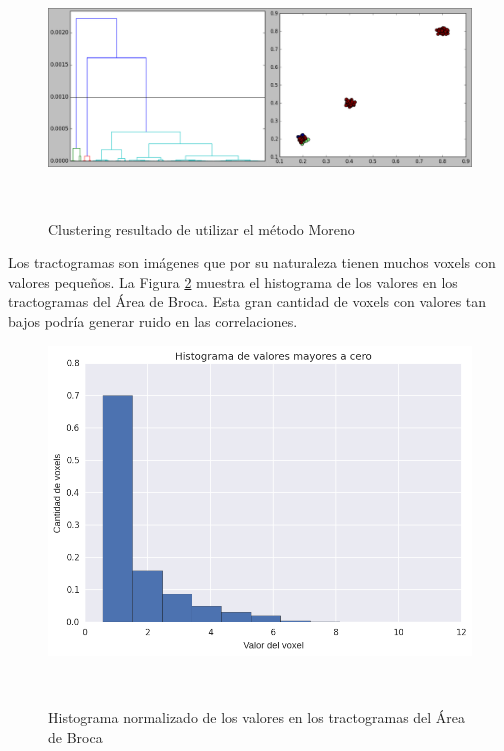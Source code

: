 \begin{figure}[h!]

\centering                                                                                                          
\begin{minipage}[b]{0.85\textwidth}
    \includegraphics[width=\textwidth]{img/3pop_moreno.png}
    \caption{Clustering resultado de utilizar el m\'etodo Moreno}
    \label{fig:3moreno}
\end{minipage} ~

\end{figure}  

Los tractogramas son im\'agenes que por su naturaleza tienen muchos voxels con 
valores peque\~nos. La Figura \ref{fig:hist_tract} muestra el histograma de los
valores en los tractogramas del \'Area de Broca. Esta gran cantidad
de voxels con valores tan bajos podr\'ia generar ruido en las correlaciones.  

\begin{figure}[h!]
              \centering                                                                                                          
\begin{minipage}[b]{0.8\textwidth}
    \includegraphics[width=\textwidth]{img/hist_tract.png}
    \caption{Histograma normalizado de los valores en los tractogramas del \'Area de Broca}
    \label{fig:hist_tract}
\end{minipage} ~

\end{figure}  


